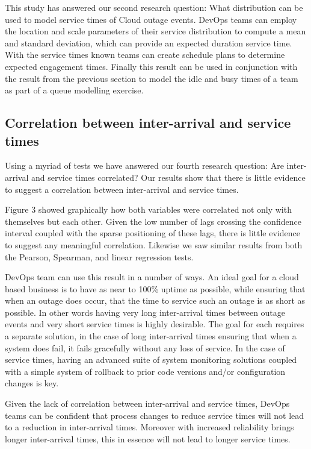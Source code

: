 \documentclass[5p]{elsarticle}
\begin{document}
This study has answered our second research question: What distribution can be used to model service times of Cloud outage events. DevOps teams can employ the location and scale parameters of their service distribution to compute a mean and standard deviation, which can provide an expected duration service time. With the service times known teams can create schedule plans to determine expected engagement times. Finally this result can be used in conjunction with the result from the previous section to model the idle and busy times of a team as part of a queue modelling exercise.

\subsection{Correlation between inter-arrival and service times}

Using a myriad of tests we have answered our fourth research question: Are inter-arrival and service times correlated? Our results show that there is little evidence to suggest a correlation between inter-arrival and service times.

Figure 3 showed graphically how both variables were correlated not only with themselves but each other. Given the low number of lags crossing the confidence interval coupled with the sparse positioning of these lags, there is little evidence to suggest any meaningful correlation. Likewise we saw similar results from both the Pearson, Spearman, and linear regression tests. 

DevOps team can use this result in a number of ways. An ideal goal for a cloud based business is to have as near to 100\% uptime as possible, while ensuring that when an outage does occur, that the time to service such an outage is as short as possible. In other words having very long inter-arrival times between outage events and very short service times is highly desirable. The goal for each requires a separate solution, in the case of long inter-arrival times ensuring that when a system does fail, it fails gracefully without any loss of service. In the case of service times, having an advanced suite of system monitoring solutions coupled with a simple system of rollback to prior code versions and/or configuration changes is key. 

Given the lack of correlation between inter-arrival and service times, DevOps teams can be confident that process changes to reduce service times will not lead to a reduction in inter-arrival times. Moreover with increased reliability brings longer inter-arrival times, this in essence will not lead to longer service times.
\end{document}

